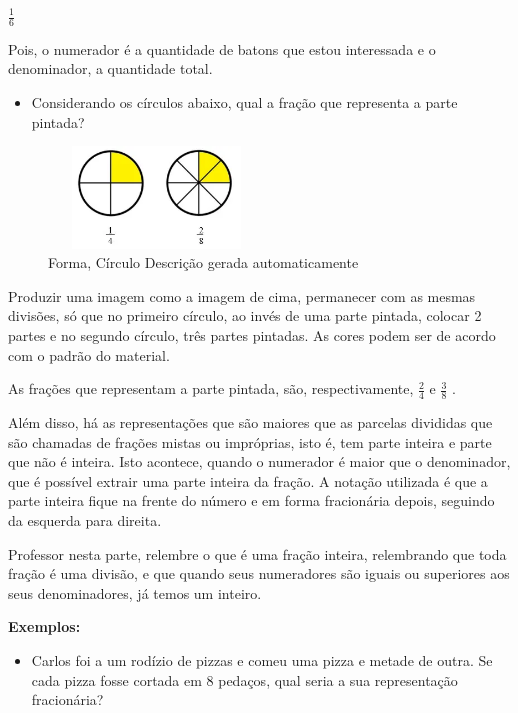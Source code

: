 \(\frac{1}{6}\)

Pois, o numerador é a quantidade de batons que estou interessada e o
denominador, a quantidade total.

\begin{itemize}
\tightlist
\item
  Considerando os círculos abaixo, qual a fração que representa a parte
  pintada?
\end{itemize}

\begin{figure}
\centering
\includegraphics[width=2.26042in,height=1.06783in]{./imgSAEB_7_MAT/media/image4.png}
\caption{Forma, Círculo Descrição gerada automaticamente}
\end{figure}

Produzir uma imagem como a imagem de cima, permanecer com as mesmas
divisões, só que no primeiro círculo, ao invés de uma parte pintada,
colocar 2 partes e no segundo círculo, três partes pintadas. As cores
podem ser de acordo com o padrão do material.

As frações que representam a parte pintada, são, respectivamente,
\(\frac{2}{4}\) e \(\frac{3}{8}\) .

Além disso, há as representações que são maiores que as parcelas
divididas que são chamadas de frações mistas ou impróprias, isto é, tem
parte inteira e parte que não é inteira. Isto acontece, quando o
numerador é maior que o denominador, que é possível extrair uma parte
inteira da fração. A notação utilizada é que a parte inteira fique na
frente do número e em forma fracionária depois, seguindo da esquerda
para direita.

Professor nesta parte, relembre o que é uma fração inteira, relembrando
que toda fração é uma divisão, e que quando seus numeradores são iguais
ou superiores aos seus denominadores, já temos um inteiro.

\textbf{Exemplos:}

\begin{itemize}
\tightlist
\item
  Carlos foi a um rodízio de pizzas e comeu uma pizza e metade de outra.
  Se cada pizza fosse cortada em 8 pedaços, qual seria a sua
  representação fracionária?
\end{itemize}

